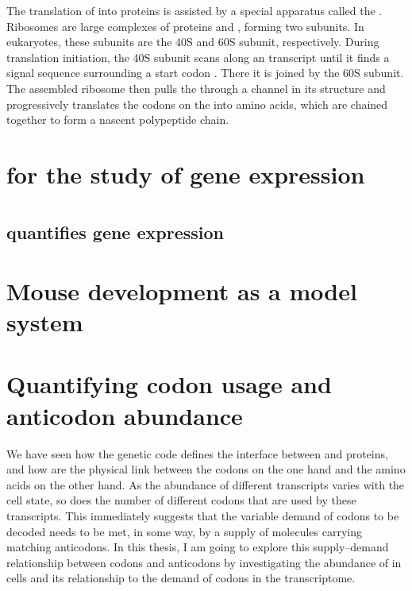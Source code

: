 The translation of \mrna into proteins is assisted by a special apparatus called
the . Ribosomes are large complexes of proteins and \rrna,
forming two subunits. In eukaryotes, these subunits are the 40S and 60S subunit,
respectively. During translation initiation, the 40S subunit scans along an
\mrna transcript until it finds a signal sequence surrounding a start codon
\citep{Kozak:2002}. There it is joined by the 60S subunit. The assembled
ribosome then pulls the \mrna through a channel in its structure and
progressively translates the codons on the \mrna into amino acids, which are
chained together to form a nascent polypeptide chain.

\section{ for the study of gene expression}

\section{}

\subsection{ quantifies  gene expression}

\section{Mouse development as a model system}

\section{Quantifying codon usage and anticodon abundance}


We have seen how the genetic code defines the interface between \mrna and
proteins, and how \trna[s] are the physical link between the codons on the one
hand and the amino acids on the other hand. As the abundance of different \mrna
transcripts varies with the cell state, so does the number of different codons
that are used by these transcripts. This immediately suggests that the variable
demand of codons to be decoded needs to be met, in some way, by a supply of
\trna molecules carrying matching anticodons. In this thesis, I am going to
explore this supply--demand relationship between codons and anticodons by
investigating the abundance of \trna[s] in cells and its relationship to the
demand of codons in the \mrna transcriptome.


